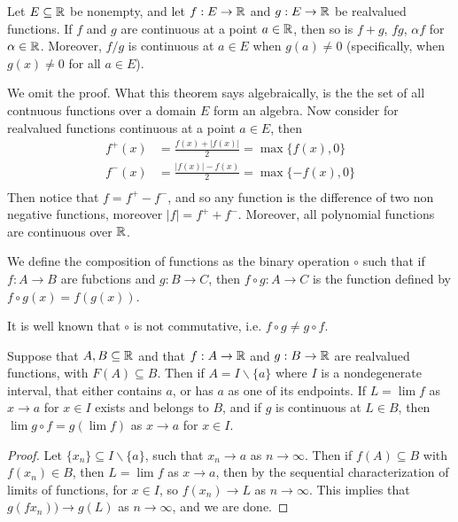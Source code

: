 \begin{theorem}\label{3.3.2}
    Let $E \subseteq \mathbb{R}$ be nonempty, and let  $f : E \rightarrow \mathbb{R}$ and $g:E \rightarrow \mathbb{R}$ be realvalued 
    functions. If  $f$ and  $g$ are continuous at a point  $a \in \mathbb{R}$, then so 
    is  $f+g$,  $fg$,  $\alpha f$ for  $\alpha \in \mathbb{R}$. Moreover, $f/g$ is continuous at  
    $a \in E$  when $g(a) \neq 0$  (specifically, when $g(x) \neq 0$ for all  $a \in E$).
\end{theorem}
We omit the proof. What this theorem says algebraically, is the the set of all 
contnuous functions over a domain $E$ form an algebra. Now consider for realvalued 
functions continuous at a point $a \in E$, then
    \begin{align*}
        f^+(x) &= \frac{f(x)+|f(x)|}{2} = \max\{f(x),0\} \\
        f^-(x) &= \frac{|f(x)|-f(x)}{2} = \max\{-f(x),0\}	\\
    \end{align*}
Then notice that $f=f^+-f^-$, and so any function is the difference of two non
negative functions, moreover $|f|=f^++f^-$. Moreover, all polynomial functions 
are continuous over $\mathbb{R}$.

\begin{definition}
    We define the composition of functions as the binary operation $\circ$ such 
    that if $f:A \rightarrow B$ are fubctions and  $g: B \rightarrow C$, then $f \circ g: A \rightarrow C$ is 
    the function defined by  $f \circ g(x)=f(g(x))$.
\end{definition}
It is well known that $\circ$ is not commutative, i.e.  $f \circ g \neq g \circ f$.

\begin{theorem}\label{3.3.3}
    Suppose that $A, B \subseteq \mathbb{R}$ and that $f:A \rightarrow \mathbb{R}$ and $g: B \rightarrow \mathbb{R}$ are realvalued 
    functions, with $F(A) \subseteq B$. Then if $A=I \backslash \{a\}$ where $I$ is a nondegenerate 
    interval, that either contains $a$, or has $a$ as one of its endpoints. 
    If $L=\lim{f}$ as $x \rightarrow a$ for $x \in I$ exists and belongs to $B$, and if  $g$
    is continuous at $L \in B$, then  $\lim{g \circ f}=g(\lim{f})$ as 
    $x \rightarrow a$  for $x \in I$.
\end{theorem}
\begin{proof}
    Let $\{x_n\} \subseteq I \backslash \{a\}$, such that $x_n \rightarrow a$ as $n \rightarrow \infty$. Then if $f(A) \subseteq B$ with 
    $f(x_n) \in B$, then  $L=\lim{f}$ as  $x \rightarrow a$, then by the sequential characterization 
    of limits of functions, for  $x \in I$, so $f(x_n) \rightarrow L$ as $n \rightarrow \infty$. This implies 
    that $g(fx_n)) \rightarrow g(L)$ as  $n \rightarrow \infty$, and we are done.
\end{proof}

